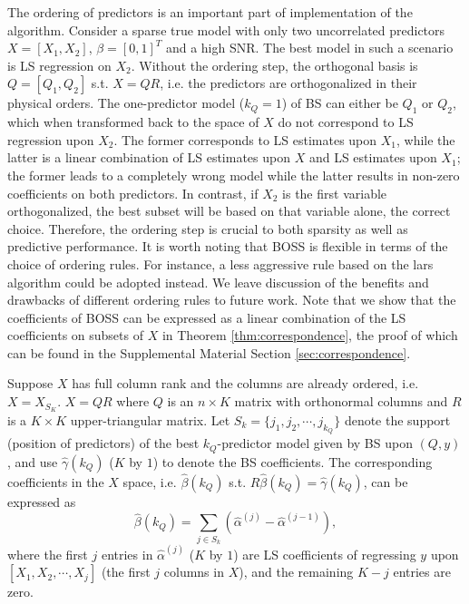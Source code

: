 The ordering of predictors is an important part of implementation of the algorithm. Consider a sparse true model with only two uncorrelated predictors $X=[X_1,X_2]$, $\beta=[0,1]^T$ and a high SNR. The best model in such a scenario is LS regression on $X_2$. Without the ordering step, the orthogonal basis is $Q=[Q_1,Q_2]$ s.t. $X=QR$, i.e. the predictors are orthogonalized in their physical orders. The one-predictor model ($k_Q=1$) of BS can either be $Q_1$ or $Q_2$, which when transformed back to the space of $X$ do not correspond to LS regression upon $X_2$. The former corresponds to LS estimates upon $X_1$, while the latter is a linear combination of LS estimates upon $X$ and LS estimates upon $X_1$; the former leads to a completely wrong model while the latter results in non-zero coefficients on both predictors. In contrast, if $X_2$ is the first variable orthogonalized, the best subset will be based on that variable alone, the correct choice. Therefore, the ordering step is crucial to both sparsity as well as predictive performance. It is worth noting that BOSS is flexible in terms of the choice of ordering rules. For instance, a less aggressive rule based on the lars algorithm \citep{efron2004least} could be adopted instead. We leave discussion of the benefits and drawbacks of different ordering rules to future work. Note that we show that the coefficients of BOSS can be expressed as a linear combination of the LS coefficients on subsets of $X$ in Theorem \ref{thm:correspondence}, the proof of which can be found in the Supplemental Material Section \ref{sec:correspondence}. 


\begin{theorem} 
	Suppose $X$ has full column rank and the columns are already ordered, i.e. $X=X_{S_{K}}$. $X=QR$ where $Q$ is an $n \times K$ matrix with orthonormal columns and $R$ is a $K \times K$ upper-triangular matrix. Let $S_k=\{j_1,j_2,\cdots,j_{k_Q}\}$ denote the support (position of predictors) of the best $k_Q$-predictor model given by BS upon $(Q,y)$, and use $\hat{\gamma}(k_Q)$ ($K$ by $1$) to denote the BS coefficients. The corresponding coefficients in the $X$ space, i.e. $\hat{\beta}(k_Q)$ s.t. $R\hat{\beta}(k_Q)=\hat{\gamma}(k_Q)$, can be expressed as
	\begin{equation*}
	\hat{\beta}(k_Q) = \sum_{j\in S_k} \left(\hat{\alpha}^{(j)} - \hat{\alpha}^{(j-1)}\right),
	\end{equation*}
	where the first $j$ entries in $\hat{\alpha}^{(j)}$ ($K$ by $1$) are LS coefficients of regressing $y$ upon $[X_1,X_2,\cdots,X_j]$ (the first $j$ columns in $X$), and the remaining $K-j$ entries are zero.

	\label{thm:correspondence}
\end{theorem}

